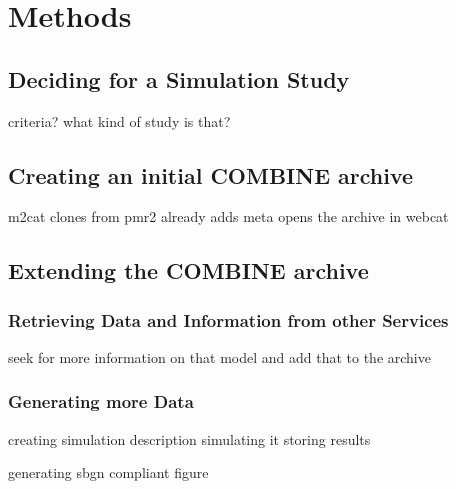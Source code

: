 
\section{Methods}

\subsection{Deciding for a Simulation Study}
criteria?
what kind of study is that?


\subsection{Creating an initial COMBINE archive}
m2cat
clones from pmr2
already adds meta
opens the archive in webcat

\subsection{Extending the COMBINE archive}
\subsubsection{Retrieving Data and Information from other Services}
seek for more information on that model
and add that to the archive

\subsubsection{Generating more Data}
creating simulation description
simulating it
storing results

generating sbgn compliant figure



